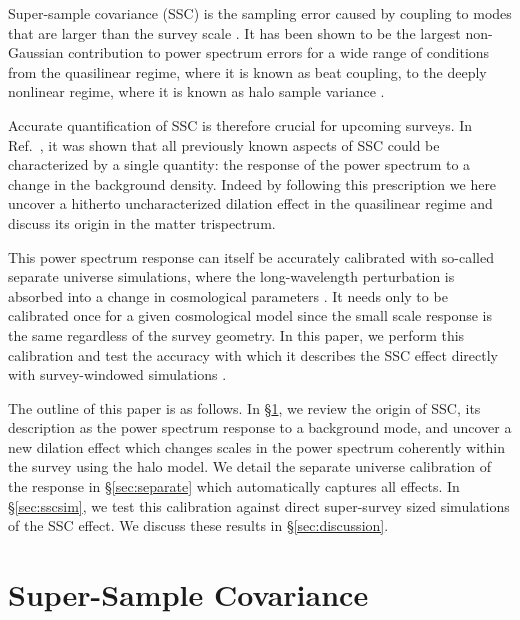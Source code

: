 \documentclass[prd,twocolumn,amsmath,amssymb,floatfix,superscriptaddress]{revtex4-1}
\begin{document}
 Super-sample covariance (SSC) is the sampling error caused
by  coupling to modes that are larger than the survey scale \cite{Hamiltonetal:06}.  It has been shown to be
the largest non-Gaussian contribution to power spectrum errors for a wide
range of conditions from the quasilinear regime, where it is known as beat coupling,
to the deeply nonlinear regime, where it is known as halo sample variance
\cite{Hamiltonetal:06,Sefusattietal:06,HuKravtsov:03,TakadaBridle:07,TakadaJain:09,Satoetal:09,Takahashietal:09,dePutter:2011ah,Schneider:2011wf,Kayoetal:13,TakadaSpergel:13,Takada:2013wfa}.  

Accurate quantification of SSC is therefore crucial for upcoming surveys.   In Ref.~\cite{Takada:2013wfa}, it was shown that all previously known aspects of SSC could
be characterized by a single quantity: the response of the power spectrum to a change
in the background density.   Indeed  
by following this prescription we here uncover a hitherto uncharacterized dilation effect in the quasilinear
regime and discuss its origin in the matter trispectrum.

This power spectrum response can itself be accurately calibrated with
so-called separate universe simulations, where the long-wavelength 
perturbation is absorbed into a change in cosmological parameters
\cite{Sirko:05,Gnedin:2011kj,Baldauf:2011bh}.   It needs only to be calibrated
once {for a given cosmological model}
since the small scale response is the same regardless of the survey geometry.
In this paper, we perform this calibration and test the accuracy with which it describes the SSC effect directly with
survey-windowed simulations \cite{HuWhite:01,Takahashietal:09,dePutter:2011ah}.


The outline of this paper is as follows.   In \S \ref{sec:ssc}, we review the origin of
SSC, its description as the power spectrum response to a background mode, and uncover
a new dilation effect which changes scales in the power spectrum coherently within the
survey using the halo model.   We detail the separate universe calibration of the response
in \S \ref{sec:separate} which automatically captures all effects.   In \S \ref{sec:sscsim}, we 
test this calibration against direct super-survey sized simulations of the SSC effect.
We discuss these results in \S \ref{sec:discussion}.




\section{Super-Sample Covariance}
\label{sec:ssc}
\end{document}

